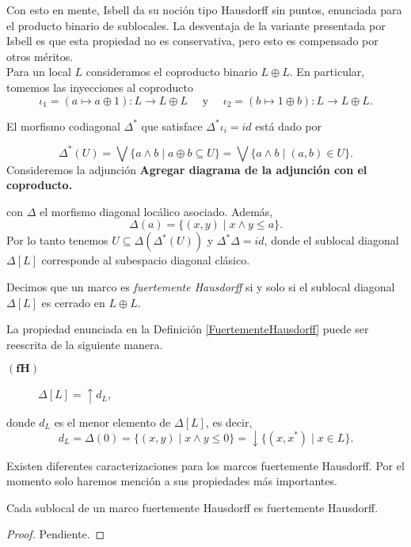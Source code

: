 \documentclass{comunicaciones}
\begin{document}
Con esto en mente, Isbell da su noción tipo Hausdorff sin puntos, enunciada para el producto binario de sublocales. La desventaja de la variante presentada por Isbell es que esta propiedad no es conservativa, pero esto es compensado por otros méritos.\\

Para un local $L$ consideramos el coproducto binario $L\oplus L$. En particular, tomemos las inyecciones al coproducto
\[
\iota_1=(a\mapsto a\oplus 1)\colon L\to L\oplus L\quad \mbox{ y }\quad \iota_2=(b\mapsto 1\oplus b)\colon L\to L\oplus L.
\]

El morfismo codiagonal $\Delta^*$ que satisface $\Delta^*\iota_i=id$ está dado por

\[
\Delta^*(U)=\bigvee\{a\wedge b\mid a\oplus b\subseteq U\}=\bigvee\{a\wedge b\mid (a, b)\in U\}. 
\]
Consideremos la adjunción
\textbf{Agregar diagrama de la adjunción con el coproducto.}

con $\Delta$ el morfismo diagonal locálico asociado. Además, 
\[
\Delta(a)=\{(x, y)\mid x\wedge y\leq a\}.
\]
Por lo tanto tenemos $U\subseteq \Delta(\Delta^*(U))$ y $\Delta^*\Delta=id$, donde el sublocal diagonal $\Delta[L]$ corresponde al subespacio diagonal clásico.

\begin{dfn}\label{FuertementeHausdorff}
    Decimos que un marco es \emph{fuertemente Hausdorff} si y solo si el sublocal diagonal $\Delta[L]$ es cerrado en $L\oplus L$.
\end{dfn}

La propiedad enunciada en la Definición \ref{FuertementeHausdorff} puede ser reescrita de la siguiente manera.

\begin{description}
    \item[$\mathbf{(fH)}$] $\Delta[L]=\uparrow d_L$, 
\end{description}
donde $d_L$ es el menor elemento de $\Delta[L]$, es decir,
\[
d_L=\Delta(0)=\{(x, y)\mid x\wedge y\leq 0\}=\downarrow\{(x, x^*)\mid x\in L\}.
\]

Existen diferentes caracterizaciones para los marcos fuertemente Hausdorff. Por el momento solo haremos mención a sus propiedades más importantes.

\begin{prop}\label{Proposicion5.3.4}
    Cada sublocal de un marco fuertemente Hausdorff es fuertemente Hausdorff.
\end{prop}

\begin{proof}
    Pendiente.
\end{proof}
\end{document}
